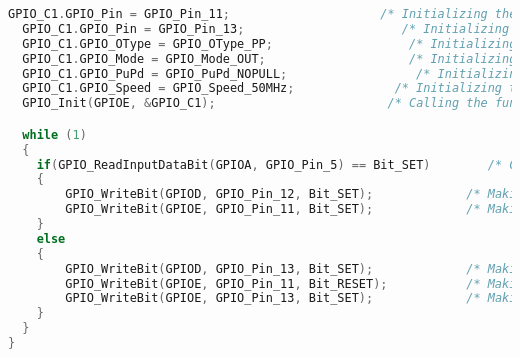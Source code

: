 \begin{lstlisting}[language=C++]
  GPIO_C1.GPIO_Pin = GPIO_Pin_11;                     /* Initializing the Pin PE11 */
  GPIO_C1.GPIO_Pin = GPIO_Pin_13;                      /* Initializing the Pin PE13 */
  GPIO_C1.GPIO_OType = GPIO_OType_PP;                   /* Initializing the Pin PE1, PE13 to work in push pull mode */
  GPIO_C1.GPIO_Mode = GPIO_Mode_OUT;                    /* Initializing the Pin PE11, PE13 to work in output mode */
  GPIO_C1.GPIO_PuPd = GPIO_PuPd_NOPULL;                  /* Initializing the Pin PE11, PE13 to work as no pull mode */
  GPIO_C1.GPIO_Speed = GPIO_Speed_50MHz;              /* Initializing the Speed of clock pulse */
  GPIO_Init(GPIOE, &GPIO_C1);                        /* Calling the function Init by passing two values*/

  while (1)
  {
	if(GPIO_ReadInputDataBit(GPIOA, GPIO_Pin_5) == Bit_SET)        /* Checking if Input is High or not */
	{
		GPIO_WriteBit(GPIOD, GPIO_Pin_12, Bit_SET);             /* Making pin PD12 set high */
		GPIO_WriteBit(GPIOE, GPIO_Pin_11, Bit_SET);             /* Making pin PE11 set high */
	}
	else
	{
		GPIO_WriteBit(GPIOD, GPIO_Pin_13, Bit_SET);             /* Making Pin PD13 set high */
		GPIO_WriteBit(GPIOE, GPIO_Pin_11, Bit_RESET);           /* Making Pin PE11 set low */
		GPIO_WriteBit(GPIOE, GPIO_Pin_13, Bit_SET);             /* Making Pin PE13 set high */
	}
  }
}


\end{lstlisting}


